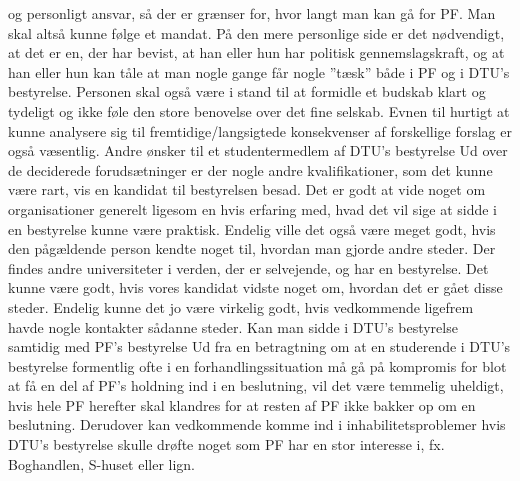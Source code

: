 og personligt ansvar, så der er grænser for, hvor langt man kan gå for PF. Man skal altså kunne følge et mandat.
På den mere personlige side er det nødvendigt, at det er en, der har bevist, at han eller hun har politisk
gennemslagskraft, og at han eller hun kan tåle at man nogle gange får nogle ”tæsk” både i PF og i DTU’s bestyrelse.
Personen skal også være i stand til at formidle et budskab klart og tydeligt og ikke føle den store benovelse over det fine
selskab. Evnen til hurtigt at kunne analysere sig til fremtidige/langsigtede konsekvenser af forskellige forslag er også
væsentlig.
Andre ønsker til et studentermedlem af DTU’s bestyrelse
Ud over de deciderede forudsætninger er der nogle andre kvalifikationer, som det kunne være rart, vis en kandidat til
bestyrelsen besad. Det er godt at vide noget om organisationer generelt ligesom en hvis erfaring med, hvad det vil sige
at sidde i en bestyrelse kunne være praktisk.
Endelig ville det også være meget godt, hvis den pågældende person kendte noget til, hvordan man gjorde andre steder.
Der findes andre universiteter i verden, der er selvejende, og har en bestyrelse. Det kunne være godt, hvis vores
kandidat vidste noget om, hvordan det er gået disse steder. Endelig kunne det jo være virkelig godt, hvis vedkommende
ligefrem havde nogle kontakter sådanne steder.
Kan man sidde i DTU’s bestyrelse samtidig med PF’s bestyrelse
Ud fra en betragtning om at en studerende i DTU’s bestyrelse formentlig ofte i en forhandlingssituation må gå på
kompromis for blot at få en del af PF’s holdning ind i en beslutning, vil det være temmelig uheldigt, hvis hele PF
herefter skal klandres for at resten af PF ikke bakker op om en beslutning. Derudover kan vedkommende komme ind i
inhabilitetsproblemer hvis DTU’s bestyrelse skulle drøfte noget som PF har en stor interesse i, fx. Boghandlen, S-huset
eller lign.
\\
\\

